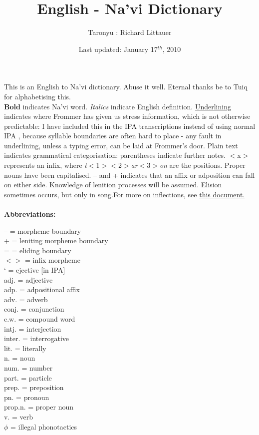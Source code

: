 \documentclass[12pt]{amsart}
\title{English - Na'vi Dictionary}
\author{Taronyu : Richard Littauer}
\date{Last updated: January 17$^{th}$, 2010}
\begin{document}
\newpage
\singlespacing
\maketitle
This is an English to Na'vi dictionary. Abuse it well. Eternal thanks be to Tuiq for alphabetising this.\\

\textbf{Bold} indicates Na'vi word. {\sl Italics} indicate English definition. \underline{Underlining} indicates where Frommer has given us stress information, which is not otherwise predictable: I have included this in the IPA transcriptions instead of using normal IPA , because syllable boundaries are often hard to place - any fault in underlining, unless a typing error, can be laid at Frommer's door. Plain text indicates grammatical categorisation: parentheses indicate further notes. $<$x$>$ represents an infix, where {\it t}$<$1$>$$<$2$>${\it ar}$<$3$>${\it on} are the positions. Proper nouns have been capitalised. -- and + indicates that an affix or adposition can fall on either side. Knowledge of lenition processes will be assumed. Elision sometimes occurs, but only in song.For more on inflections, see \href{http://www.talknavi.com/taronyu/Inflections.pdf}{this document.}\\ \\
{\bf Abbreviations:}
\begin{multicols}{2}{\noindent
-- = morpheme boundary\\
+ = leniting morpheme boundary\\
= = eliding boundary\\
$< >$ = infix morpheme\\
` = ejective [in IPA]\\
adj. = adjective\\
adp. = adpositional affix\\
adv. = adverb\\
conj. = conjunction\\
c.w. = compound word\\
intj. = interjection\\
inter. = interrogative\\
lit. = literally\\
n. = noun\\
num. = number\\
part. = particle\\
prep. = preposition\\
pn. = pronoun\\
prop.n. = proper noun\\
v. = verb\\
$\phi$ = illegal phonotactics}
\end{multicols}
\end{document}
